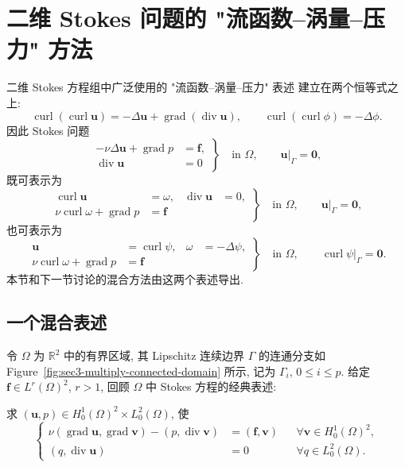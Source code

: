 \section{二维 Stokes 问题的 "流函数--涡量--压力" 方法}
\label{sec:incompressible-sfvp}

二维 Stokes 方程组中广泛使用的 "流函数--涡量--压力" 表述
建立在两个恒等式之上:
\[
\operatorname{curl}(\operatorname{curl}\mathbf u)
=-\Delta\mathbf u+\operatorname{grad}(\operatorname{div}\mathbf u),
\qquad
\operatorname{curl}(\operatorname{curl}\phi)=-\Delta\phi.
\]
因此 Stokes 问题
\[
\left.
\begin{aligned}
-\nu\Delta\mathbf u+\operatorname{grad}p&=\mathbf f,\\
\operatorname{div}\mathbf u&=0
\end{aligned}
\right\}\quad\text{in }\Omega,
\qquad
\mathbf u|_\Gamma=\mathbf0,
\]
既可表示为
\[
\left.
\begin{aligned}
\operatorname{curl}\mathbf u&=\omega,
&\operatorname{div}\mathbf u&=0,\\
\nu\operatorname{curl}\omega+\operatorname{grad}p&=\mathbf f
\end{aligned}
\right\}\quad\text{in }\Omega,
\qquad
\mathbf u|_\Gamma=\mathbf0,
\]
也可表示为
\[
\left.
\begin{aligned}
\mathbf u&=\operatorname{curl}\psi,
&\omega&=-\Delta\psi,\\
\nu\operatorname{curl}\omega+\operatorname{grad}p&=\mathbf f
\end{aligned}
\right\}\quad\text{in }\Omega,
\qquad
\operatorname{curl}\psi|_\Gamma=\mathbf0.
\]
本节和下一节讨论的混合方法由这两个表述导出.

\subsection{一个混合表述}
\label{subsec:incompressible-sfvp-mixed-formulation}

令 $\Omega$ 为 $\mathbb R^2$ 中的有界区域,
其 Lipschitz 连续边界 $\Gamma$ 的连通分支如
Figure~\ref{fig:sec3-multiply-connected-domain} 所示,
记为 $\Gamma_i$, $0\leq i\leq p$.
给定 $\mathbf f\in L^r(\Omega)^2$, $r>1$,
回顾 $\Omega$ 中 Stokes 方程的经典表述:

求 $(\mathbf u,p)\in H_0^1(\Omega)^2\times L_0^2(\Omega)$, 使
\begin{equation}\label{eq:incompressible-sfvp-stokes}
\left\{
\begin{aligned}
\nu(\operatorname{grad}\mathbf u,\operatorname{grad}\mathbf v)
-(p,\operatorname{div}\mathbf v)
&=(\mathbf f,\mathbf v)
&&\forall\mathbf v\in H_0^1(\Omega)^2,\\
(q,\operatorname{div}\mathbf u)&=0
&&\forall q\in L_0^2(\Omega).
\end{aligned}
\right.
\end{equation}


